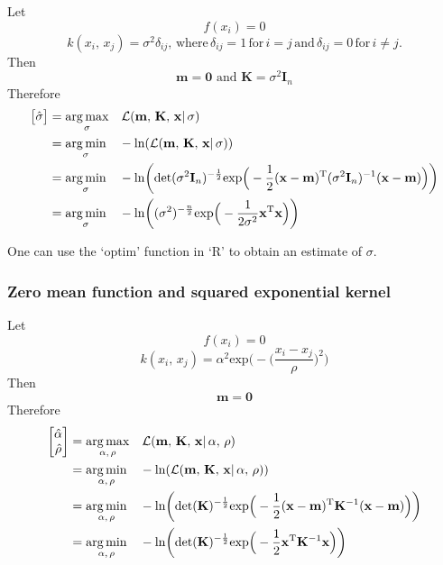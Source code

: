          Let \[f(x_{i}) = 0\]
          \[k(x_{i},\, x_{j}) = \sigma^2\delta_{ij}, \, \text{where} \, \delta_{ij} = 1 \, \text{for} \, i = j \, \text{and} \, \delta_{ij} = 0 \, \text{for} \, i \neq j.\]
         Then \[\mathbf{m} = \mathbf{0} \text{ and } \mathbf{K} = \sigma^2\mathbf{I}_{n}\]
         Therefore
         \begin{align*}
            \begin{bmatrix} \hat{\sigma} \end{bmatrix}
            & = \underset{\sigma}{\arg\max} \quad \mathcal{L}(\mathbf{m} ,\, \mathbf{K} ,\, \mathbf{x}| \, \sigma)\\
            & = \underset{\sigma}{\arg\min} \quad -\text{ln}(\mathcal{L}(\mathbf{m} ,\, \mathbf{K} ,\, \mathbf{x}| \, \sigma))\\
            & = \underset{\sigma}{\arg\min} \quad -\text{ln} \bigg(\text{det}(\sigma^2\mathbf{I}_{n})^{-\frac{1}{2}} 
            \text{exp} \Big(-\frac{1}{2} (\mathbf{x} - \mathbf{m})^{\text{\text{T}}} (\sigma^2\mathbf{I}_{n})^{-1} (\mathbf{x} - \mathbf{m}) \Big) \bigg)\\
            & = \underset{\sigma}{\arg\min} \quad -\text{ln} \bigg((\sigma^2)^{-\frac{n}{2}} 
            \text{exp} \Big(-\frac{1}{2\sigma^2} \mathbf{x}^{\text{\text{T}}} \mathbf{x} \Big) \bigg)
         \end{align*}
         
         One can use the `optim' function in `R' to obtain an estimate of \(\sigma\).

      \subsubsection{Zero mean function and squared exponential kernel}

         Let \[f(x_{i}) = 0\]
            \[k(x_{i},\, x_{j}) = \alpha^{2} \text{exp} \bigg(- \Big(\frac{x_i - x_j}{\rho} \Big)^2 \bigg)\]
         Then \[\mathbf{m} = \mathbf{0}\]
         Therefore
         \begin{align*}
            \begin{bmatrix} \hat{\alpha} \\ \hat{\rho} \end{bmatrix}
            & = \underset{\alpha ,\, \rho}{\arg\max} \quad \mathcal{L}(\mathbf{m} ,\, \mathbf{K} ,\, \mathbf{x}| \, \alpha ,\, \rho)\\
            & = \underset{\alpha ,\, \rho}{\arg\min} \quad -\text{ln}(\mathcal{L}(\mathbf{m} ,\, \mathbf{K} ,\, \mathbf{x}| \, \alpha ,\, \rho))\\
            & = \underset{\alpha ,\, \rho}{\arg\min} \quad -\text{ln} \bigg(\text{det}(\mathbf{K})^{-\frac{1}{2}} 
            \text{exp} \Big(-\frac{1}{2} (\mathbf{x} - \mathbf{m})^{\text{\text{T}}} \mathbf{K}^{-1} (\mathbf{x} - \mathbf{m}) \Big) \bigg)\\
            & = \underset{\alpha ,\, \rho}{\arg\min} \quad -\text{ln} \bigg(\text{det}(\mathbf{K})^{-\frac{1}{2}} 
            \text{exp} \Big(-\frac{1}{2} \mathbf{x}^{\text{\text{T}}} \mathbf{K}^{-1} \mathbf{x} \Big) \bigg)
         \end{align*}
         
